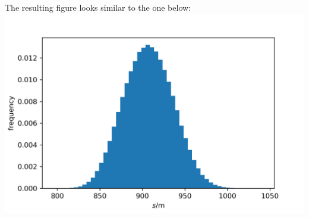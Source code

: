 \documentclass[11pt,a4paper, d]{scrartcl}
\makeatletter
\newcommand{\boxspacing}{\kern\kvtcb@left@rule\kern\kvtcb@boxsep}
\newcommand{\prompt}[4]{
        {\ttfamily\llap{{\color{#2}[#3]:\hspace{3pt}#4}}\vspace{-\baselineskip}}
    }
\makeatother
\begin{document}
The resulting figure looks similar to the one below:
\includegraphics{figures/BrakingDistance.png}

    \begin{tcolorbox}[breakable, size=fbox, boxrule=1pt, pad at break*=1mm,colback=cellbackground, colframe=cellborder]
\prompt{In}{incolor}{ }{\boxspacing}
\begin{Verbatim}[commandchars=\\\{\}]

\end{Verbatim}
\end{tcolorbox}


    
    
    
\end{document}

